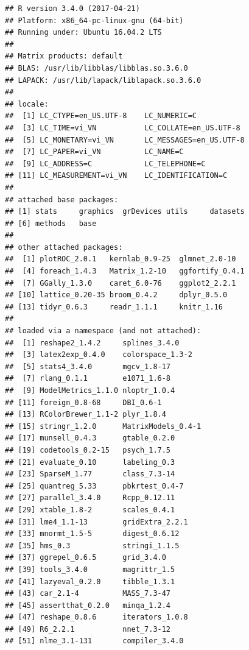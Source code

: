 \documentclass[a4paper]{report}\usepackage[]{graphicx}\usepackage[]{color}
\makeatletter
\newenvironment{kframe}{%
 \def\at@end@of@kframe{}%
 \ifinner\ifhmode%
  \def\at@end@of@kframe{\end{minipage}}%
  \begin{minipage}{\columnwidth}%
 \fi\fi%
 \def\FrameCommand##1{\hskip\@totalleftmargin \hskip-\fboxsep
 \colorbox{shadecolor}{##1}\hskip-\fboxsep
     \hskip-\linewidth \hskip-\@totalleftmargin \hskip\columnwidth}%
 \MakeFramed {\advance\hsize-\width
   \@totalleftmargin\z@ \linewidth\hsize
   \@setminipage}}%
 {\par\unskip\endMakeFramed%
 \at@end@of@kframe}
\newenvironment{knitrout}{}{} %
\makeatother
\begin{document}
\begin{knitrout}\small
{}\color{fgcolor}\begin{kframe}
\begin{verbatim}
## R version 3.4.0 (2017-04-21)
## Platform: x86_64-pc-linux-gnu (64-bit)
## Running under: Ubuntu 16.04.2 LTS
## 
## Matrix products: default
## BLAS: /usr/lib/libblas/libblas.so.3.6.0
## LAPACK: /usr/lib/lapack/liblapack.so.3.6.0
## 
## locale:
##  [1] LC_CTYPE=en_US.UTF-8    LC_NUMERIC=C           
##  [3] LC_TIME=vi_VN           LC_COLLATE=en_US.UTF-8 
##  [5] LC_MONETARY=vi_VN       LC_MESSAGES=en_US.UTF-8
##  [7] LC_PAPER=vi_VN          LC_NAME=C              
##  [9] LC_ADDRESS=C            LC_TELEPHONE=C         
## [11] LC_MEASUREMENT=vi_VN    LC_IDENTIFICATION=C    
## 
## attached base packages:
## [1] stats     graphics  grDevices utils     datasets 
## [6] methods   base     
## 
## other attached packages:
##  [1] plotROC_2.0.1   kernlab_0.9-25  glmnet_2.0-10  
##  [4] foreach_1.4.3   Matrix_1.2-10   ggfortify_0.4.1
##  [7] GGally_1.3.0    caret_6.0-76    ggplot2_2.2.1  
## [10] lattice_0.20-35 broom_0.4.2     dplyr_0.5.0    
## [13] tidyr_0.6.3     readr_1.1.1     knitr_1.16     
## 
## loaded via a namespace (and not attached):
##  [1] reshape2_1.4.2     splines_3.4.0     
##  [3] latex2exp_0.4.0    colorspace_1.3-2  
##  [5] stats4_3.4.0       mgcv_1.8-17       
##  [7] rlang_0.1.1        e1071_1.6-8       
##  [9] ModelMetrics_1.1.0 nloptr_1.0.4      
## [11] foreign_0.8-68     DBI_0.6-1         
## [13] RColorBrewer_1.1-2 plyr_1.8.4        
## [15] stringr_1.2.0      MatrixModels_0.4-1
## [17] munsell_0.4.3      gtable_0.2.0      
## [19] codetools_0.2-15   psych_1.7.5       
## [21] evaluate_0.10      labeling_0.3      
## [23] SparseM_1.77       class_7.3-14      
## [25] quantreg_5.33      pbkrtest_0.4-7    
## [27] parallel_3.4.0     Rcpp_0.12.11      
## [29] xtable_1.8-2       scales_0.4.1      
## [31] lme4_1.1-13        gridExtra_2.2.1   
## [33] mnormt_1.5-5       digest_0.6.12     
## [35] hms_0.3            stringi_1.1.5     
## [37] ggrepel_0.6.5      grid_3.4.0        
## [39] tools_3.4.0        magrittr_1.5      
## [41] lazyeval_0.2.0     tibble_1.3.1      
## [43] car_2.1-4          MASS_7.3-47       
## [45] assertthat_0.2.0   minqa_1.2.4       
## [47] reshape_0.8.6      iterators_1.0.8   
## [49] R6_2.2.1           nnet_7.3-12       
## [51] nlme_3.1-131       compiler_3.4.0
\end{verbatim}
\end{kframe}
\end{knitrout}





\printbibliography
{}
\end{document}
